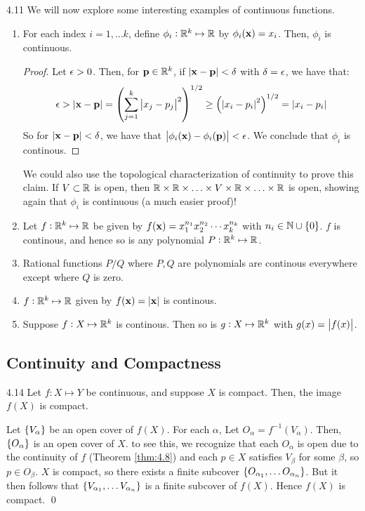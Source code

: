 \begin{example}{}{4.11}
    We will now explore some interesting examples of continuous functions.
    \begin{enumerate}
        \item For each index $i = 1, \ldots k$, define $\phi_i: \mathbb{R}^k \mapsto \mathbb{R}$ by $\phi_i(\mathbf{x}) = x_i$. Then, $\phi_i$ is continuous.
        \begin{proof}
            Let $\epsilon > 0$. Then, for $\mathbf{p} \in \mathbb{R}^k$, if $\abs{\mathbf{x} - \mathbf{p}} < \delta$ with $\delta = \epsilon$, we have that:
            \begin{align*}
                \epsilon > \abs{\mathbf{x} - \mathbf{p}} = \left(\sum_{j=1}^k \abs{x_j - p_j}^2\right)^{1/2} \geq \left(\abs{x_i - p_i}^2\right)^{1/2} = \abs{x_i - p_i}
            \end{align*}
            So for $\abs{\mathbf{x} - \mathbf{p}} < \delta$, we have that $\abs{\phi_i(\mathbf{x}) - \phi_i(\mathbf{p})} < \epsilon$. We conclude that $\phi_i$ is continous.
        \end{proof}
        We could also use the topological characterization of continuity to prove this claim. If $V \subset \mathbb{R}$ is open, then $\mathbb{R} \times \mathbb{R} \times \ldots \times V \times \mathbb{R} \times \ldots \times \mathbb{R}$ is open, showing again that $\phi_i$ is continuous (a much easier proof)!
        \item Let $f: \mathbb{R}^k \mapsto \mathbb{R}$ be given by $f(\mathbf{x}) = x_1^{n_1}x_2^{n_2}\cdots x_k^{n_k}$ with $n_i \in \mathbb{N} \cup \set{0}$. $f$ is continous, and hence so is any polynomial $P: \mathbb{R}^k \mapsto \mathbb{R}$.
        \item Rational functions $P/Q$ where $P, Q$ are polynomials are continous everywhere except where $Q$ is zero.
        \item $f: \mathbb{R}^k \mapsto \mathbb{R}$ given by $f(\mathbf{x}) = \abs{\mathbf{x}}$ is continous.
        \item Suppose $f: X \mapsto \mathbb{R}^k$ is continous. Then so is $g: X \mapsto \mathbb{R}^k$ with $g(x) = \abs{f(x)}$.
    \end{enumerate}
\end{example}

\subsection{Continuity and Compactness}

\setcounter{rudin}{13}
\begin{theorem}{}{4.14}
    Let $f: X \mapsto Y$ be continuous, and suppose $X$ is compact. Then, the image $f(X)$ is compact.
\end{theorem}
\begin{nproof}
    Let $\set{V_\alpha}$ be an open cover of $f(X)$. For each $\alpha$, Let $O_\alpha = f^{-1}(V_\alpha)$. Then, $\set{O_\alpha}$ is an open cover of $X$. to see this, we recognize that each $O_\alpha$ is open due to the continuity of $f$ (Theorem \ref{thm:4.8}) and each $p \in X$ satisfies $V_\beta$ for some $\beta$, so $p \in O_\beta$. $X$ is compact, so there exists a finite subcover $\set{O_{\alpha_1}, \ldots O_{\alpha_n}}$. But it then follows that $\set{V_{\alpha_1}, \ldots V_{\alpha_n}}$ is a finite subcover of $f(X)$. Hence $f(X)$ is compact. \qed
\end{nproof}

